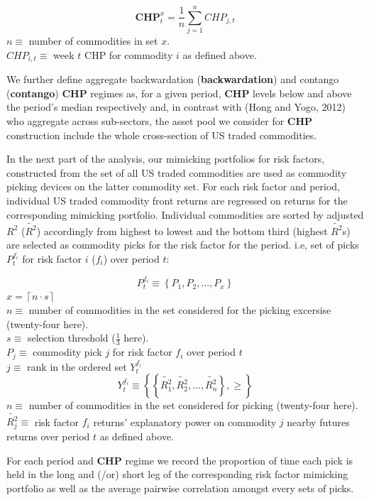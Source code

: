 \documentclass[]{elsarticle} %
\begin{document}
\[\mathbf{CHP}_{t}^{x}=\frac{1}{n}\sum_{j=1}^{n}CHP_{j,t}\] \(n\equiv\)
number of commodities in set \(x\).\\
\(CHP_{i,t}\equiv\) week \(t\) CHP for commodity \(i\) as defined above.

We further define aggregate backwardation (\textbf{backwardation}) and
contango (\textbf{contango}) \textbf{CHP} regimes as, for a given
period, \textbf{CHP} levels below and above the period's median
respectively and, in contrast with (Hong and Yogo, 2012) who aggregate
across sub-sectors, the asset pool we consider for \textbf{CHP}
construction include the whole cross-section of US traded commodities.

In the next part of the analysis, our mimicking portfolios for risk
factors, constructed from the set of all US traded commodities are used
as commodity picking devices on the latter commodity set. For each risk
factor and period, individual US traded commodity front returns are
regressed on returns for the corresponding mimicking portfolio.
Individual commodities are sorted by adjusted \(R^{2}\)
(\(\tilde{R^{2}}\)) accordingly from highest to lowest and the bottom
third (highest \(\tilde{R^{2}}\)s) are selected as commodity picks for
the risk factor for the period. i.e, set of picks \(P_{t}^{f_{i}}\) for
risk factor \(i\) (\(f_{i}\)) over period \(t\):

\[P_{t}^{f_{i}}\equiv\left \{ P_{1}, P_{2}, ..., P_{x} \right \}\]
\(x = \left \lceil n \cdot s \right \rceil\)\\
\(n\equiv\) number of commodities in the set considered for the picking
excersise (twenty-four here).\\
\(s\equiv\) selection threshold (\(\frac{1}{3}\) here).\\
\(P_{j}\equiv\) commodity pick \(j\) for risk factor \(f_{i}\) over
period \(t\)\\
\(j\equiv\) rank in the ordered set \(Y_{t}^{f_{i}}\)\\
\[Y_{t}^{f_{i}}\equiv\left \{ \left \{ \tilde{R_{1}^{2}}, \tilde{R_{2}^{2}}, ..., \tilde{R_{n}^{2}} \right \}, \geq \right \}\]
\(n\equiv\) number of commodities in the set considered for picking
(twenty-four here).\\
\(\tilde{R_{j}^{2}}\equiv\) risk factor \(f_{i}\) returns' explanatory
power on commodity \(j\) nearby futures returns over period \(t\) as
defined above.

For each period and \textbf{CHP} regime we record the proportion of time
each pick is held in the long and (/or) short leg of the corresponding
risk factor mimicking portfolio as well as the average pairwise
correlation amongst every sets of picks.
\end{document}
